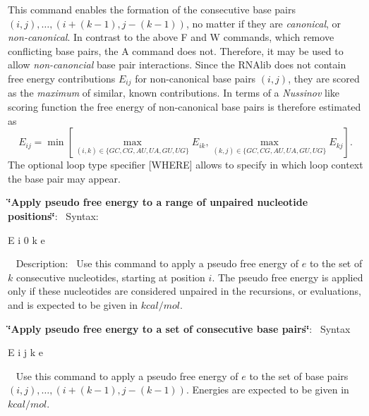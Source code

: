 \begin{DoxyEnumerate}
 This command enables the formation of the consecutive base pairs $ (i,j), \ldots, (i+(k-1), j-(k-1)) $, no matter if they are {\itshape canonical}, or {\itshape non-\/canonical}. In contrast to the above {\ttfamily F} and {\ttfamily W} commands, which remove conflicting base pairs, the {\ttfamily A} command does not. Therefore, it may be used to allow {\itshape non-\/canoncial} base pair interactions. Since the R\+N\+Alib does not contain free energy contributions $ E_{ij} $ for non-\/canonical base pairs $ (i,j) $, they are scored as the {\itshape maximum} of similar, known contributions. In terms of a {\itshape Nussinov} like scoring function the free energy of non-\/canonical base pairs is therefore estimated as \[ E_{ij} = \min \left[ \max_{(i,k) \in \{GC, CG, AU, UA, GU, UG\}} E_{ik}, \max_{(k,j) \in \{GC, CG, AU, UA, GU, UG\}} E_{kj} \right]. \] The optional loop type specifier {\ttfamily }\mbox{[}W\+H\+E\+RE\mbox{]} allows to specify in which loop context the base pair may appear.
\item {\bfseries \char`\"{}\+Apply pseudo free energy to a range of unpaired nucleotide positions\char`\"{}}\+:~\newline
 Syntax\+:
\begin{DoxyCode}
E i 0 k e 
\end{DoxyCode}
~\newline
 Description\+:~\newline
 Use this command to apply a pseudo free energy of $ e $ to the set of $ k $ consecutive nucleotides, starting at position $ i $. The pseudo free energy is applied only if these nucleotides are considered unpaired in the recursions, or evaluations, and is expected to be given in $ kcal / mol $.
\item {\bfseries \char`\"{}\+Apply pseudo free energy to a set of consecutive base pairs\char`\"{}}\+:~\newline
 Syntax
\begin{DoxyCode}
E i j k e 
\end{DoxyCode}
~\newline
 Use this command to apply a pseudo free energy of $ e $ to the set of base pairs $ (i,j), \ldots, (i+(k-1), j-(k-1)) $. Energies are expected to be given in $ kcal / mol $. 
\end{DoxyEnumerate}